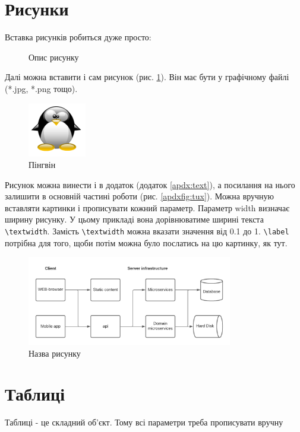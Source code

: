 \section{Рисунки}

Вставка рисунків робиться дуже просто:

\begin{figure}[h]
\caption{Опис рисунку}
\end{figure}

Далі можна вставити і сам рисунок (рис. \ref{fig:tux}). Він має бути у графічному файлі ({*}.jpg, {*}.png тощо). 

\begin{figure}[h]
 \centering\includegraphics{img/Tux.png}
 \caption{Пінгвін}
 \label{fig:tux}
\end{figure}

Рисунок можна винести і в додаток (додаток \ref{apdx:text}), \label{linkpage} а посилання на нього залишити в основній частині роботи (рис. \ref{apdxfig:tux}).
Можна вручную вставляти картинки і прописувати кожний параметр.
Параметр width визначає ширину рисунку. У цьому прикладі вона дорівнюватиме ширині текста \verb|\textwidth|. Замість \verb|\textwidth| можна вказати значення від 0.1 до 1. \verb|\label| потрібна для того, щоби потім можна було послатись на цю картинку, як тут.

\begin{figure}[!htb]
 \centering
 \includegraphics[width=0.8\textwidth]{img/fig1.png}
 \caption{Назва рисунку}
 \label{fig:fig1}
\end{figure}

\section{Таблиці}
Таблиці  - це складний об'єкт. Тому всі параметри треба прописувати вручну

